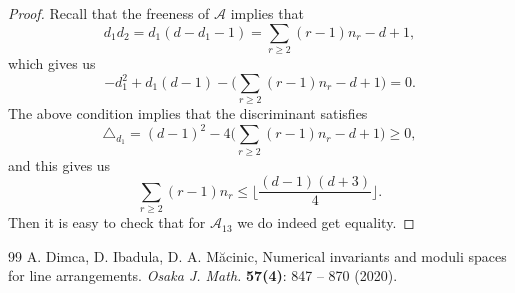 \documentclass[10pt,a4paper]{amsart}
\newcommand{\A}{{\mathcal A}}
\begin{document}
\begin{proof}
Recall that the freeness of $\A$ implies that 
$$d_{1}d_{2} = d_{1}(d-d_{1}-1) = \sum_{r\geq 2}(r-1)n_{r}-d+1,$$
which gives us 
$$-d_{1}^{2}+d_{1}(d-1) - \bigg(\sum_{r\geq 2}(r-1)n_{r}-d+1\bigg)=0.$$
The above condition implies that the discriminant satisfies
$$\triangle_{d_{1}} = (d-1)^2 - 4\bigg(\sum_{r\geq 2}(r-1)n_{r}-d+1\bigg) \geq 0,$$
and this gives us
$$\sum_{r\geq 2}(r-1)n_{r} \leq \bigg\lfloor \frac{(d-1)(d+3)}{4}\bigg\rfloor.$$
Then it is easy to check that for $\A_{13}$ we do indeed get equality.
\end{proof}

\begin{thebibliography}{99}
 A. Dimca, D. Ibadula, D. A. Măcinic, Numerical invariants and moduli spaces for line arrangements. \textit{Osaka J. Math.} \textbf{57(4)}: 847 -- 870 (2020).
\end{thebibliography}
\end{document}
